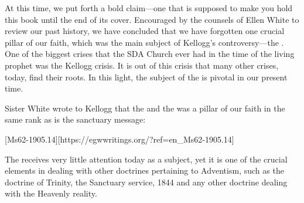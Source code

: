 At this time, we put forth a bold claim—one that is supposed to make you hold this book until the end of its cover. Encouraged by the counsels of Ellen White to review our past history, we have concluded that we have forgotten one crucial pillar of our faith, which was the main subject of Kellogg’s controversy—the . One of the biggest crises that the SDA Church ever had in the time of the living prophet was the Kellogg crisis. It is out of this crisis that many other crises, today, find their roots. In this light, the subject of the  is pivotal in our present time. 

Sister White wrote to Kellogg that the  and the  was a pillar of our faith in the same rank as is the sanctuary message:

[Ms62-1905.14][https://egwwritings.org/?ref=en\_Ms62-1905.14]

The  receives very little attention today as a subject, yet it is one of the crucial elements in dealing with other doctrines pertaining to Adventism, such as the doctrine of Trinity, the Sanctuary service, 1844 and any other doctrine dealing with the Heavenly reality.

